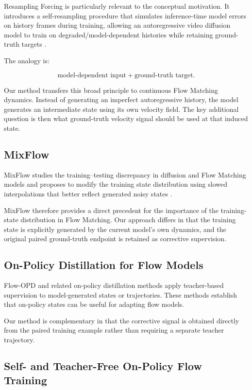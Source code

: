 \documentclass[11pt]{article}
\begin{document}
Resampling Forcing is particularly relevant to the conceptual motivation.
It introduces a self-resampling procedure that simulates inference-time model
errors on history frames during training, allowing an autoregressive video
diffusion model to train on degraded/model-dependent histories while retaining
ground-truth targets \cite{guo2025resampling}.

The analogy is:

\begin{equation}
\text{model-dependent input}
+
\text{ground-truth target}.
\end{equation}

Our method transfers this broad principle to continuous Flow Matching
dynamics. Instead of generating an imperfect autoregressive history, the model
generates an intermediate state using its own velocity field. The key
additional question is then what ground-truth velocity signal should be used
at that induced state.

\subsection{MixFlow}

MixFlow studies the training--testing discrepancy in diffusion and Flow
Matching models and proposes to modify the training state distribution using
slowed interpolations that better reflect generated noisy states
\cite{li2025mixflow}.

MixFlow therefore provides a direct precedent for the importance of the
training-state distribution in Flow Matching. Our approach differs in that the
training state is explicitly generated by the current model's own dynamics,
and the original paired ground-truth endpoint is retained as corrective
supervision.

\subsection{On-Policy Distillation for Flow Models}

Flow-OPD and related on-policy distillation methods apply teacher-based
supervision to model-generated states or trajectories. These methods establish
that on-policy states can be useful for adapting flow models.

Our method is complementary in that the corrective signal is obtained directly
from the paired training example rather than requiring a separate teacher
trajectory.

\subsection{Self- and Teacher-Free On-Policy Flow Training}
\end{document}
